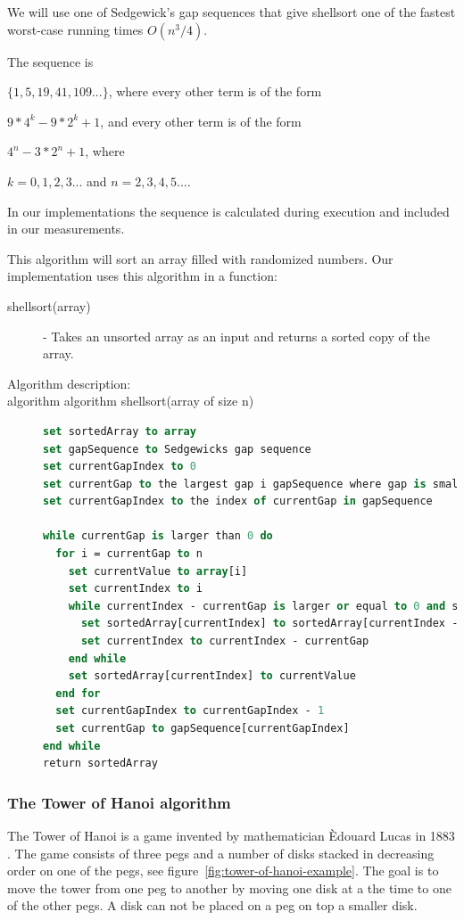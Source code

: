\documentclass {article}
\begin{document}
We will use one of Sedgewick's gap sequences that give shellsort one of the fastest worst-case running times \(O(n^3/4)\). 

The sequence is 

\(\{1, 5, 19, 41, 109...\}\), where every other term is of the form

\(9 * 4^k - 9 * 2^k + 1\), and every other term is of the form

\(4^n - 3 * 2^n + 1\), where 

\(k = {0, 1, 2, 3...}\) and \(n = {2, 3, 4, 5...}\).
 
In our implementations the sequence is calculated during execution and included in our measurements.

This algorithm will sort an array filled with randomized numbers. Our implementation uses this algorithm in a function:

\begin{description}
\item[shellsort(array)] - Takes an unsorted array as an input and returns a sorted copy of the array. 

\item[Algorithm description:]
\item[algorithm algorithm shellsort(array of size n)]
\item []
\begin{lstlisting}[language=Pascal]
set sortedArray to array
set gapSequence to Sedgewicks gap sequence
set currentGapIndex to 0
set currentGap to the largest gap i gapSequence where gap is smaller than n divided by 2
set currentGapIndex to the index of currentGap in gapSequence

while currentGap is larger than 0 do
  for i = currentGap to n
    set currentValue to array[i]
    set currentIndex to i
    while currentIndex - currentGap is larger or equal to 0 and sortedArray[currentIndex - currentGap] is larger than currentValue do
      set sortedArray[currentIndex] to sortedArray[currentIndex - currentGap]
      set currentIndex to currentIndex - currentGap
    end while
    set sortedArray[currentIndex] to currentValue
  end for
  set currentGapIndex to currentGapIndex - 1
  set currentGap to gapSequence[currentGapIndex]
end while
return sortedArray
\end{lstlisting}
\end{description}
\subsubsection{The Tower of Hanoi algorithm}
\label{sec:hanoi}
The Tower of Hanoi is a game invented by mathematician \`{E}douard Lucas in 1883 \cite{hanoi}. The game consists of three pegs and a number of disks stacked in decreasing order on one of the pegs, see figure~\ref{fig:tower-of-hanoi-example}. The goal is to move the tower from one peg to another by moving one disk at a the time to one of the other pegs. A disk can not be placed on a peg on top a smaller disk. 
\end{document}
